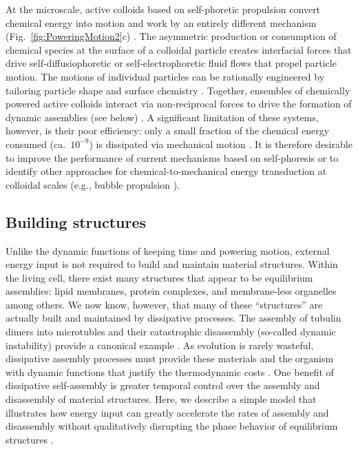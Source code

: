 \begin{appendices}
At the microscale, active colloids based on self-phoretic propulsion convert chemical energy into motion and work by an entirely different mechanism (Fig.~\ref{fig:PoweringMotion2}c) \citep{illien2017fuelled, Moran2017}. The asymmetric production or consumption of chemical species at the surface of a colloidal particle creates interfacial forces that drive self-diffusiophoretic or self-electrophoretic fluid flows that propel particle motion.  The motions of individual particles can be rationally engineered by tailoring particle shape and surface chemistry \cite{Brooks2018shape}.  Together, ensembles of chemically powered active colloids interact via non-reciprocal forces to drive the formation of dynamic assemblies (see below) \cite{wang2015one, Lowen2018}.  A significant limitation of these systems, however, is their poor efficiency: only a small fraction of the chemical energy consumed (ca.~$10^{-9}$) is dissipated via mechanical motion \cite{wang2013understanding}. It is therefore desirable to improve the performance of current mechanisms based on self-phoresis or to identify other approaches for chemical-to-mechanical energy transduction at colloidal scales (e.g., bubble propulsion \cite{li2016rocket}). 

\subsection{Building structures}

Unlike the dynamic functions of keeping time and powering motion, external energy input is not required to build and maintain material structures.  Within the living cell, there exist many structures that appear to be equilibrium assemblies: lipid membranes, protein complexes, and membrane-less organelles among others.  We now know, however, that many of these ``structures'' are actually built and maintained by dissipative processes.  The assembly of tubulin dimers into microtubles and their catastrophic disassembly (so-called dynamic instability) provide a canonical example \cite{Desai1997}. As evolution is rarely wasteful, dissipative assembly processes must provide these materials and the organism with dynamic functions that justify the thermodynamic costs \cite{Ragazzon2018}. One benefit of dissipative self-assembly \cite{De2018} is greater temporal control over the assembly and disassembly of material structures.  Here, we describe a simple model that illustrates how energy input can greatly accelerate the rates of assembly and disassembly without qualitatively disrupting the phase behavior of equilibrium structures \cite{marsland2018active}. 


\end{appendices}
